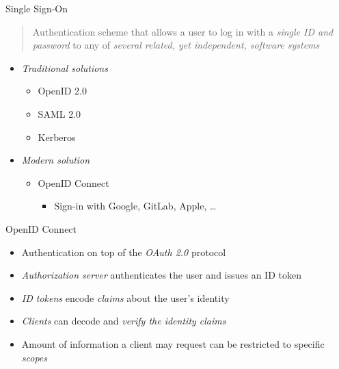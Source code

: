 \documentclass[aspectratio=169]{beamer}
\begin{document}
\begin{frame}{Single Sign-On}
	\begin{quotation}
		\hspace{-\parindent}Authentication scheme that allows a user to log in with a \emph{single ID and password} to any of \emph{several related, yet independent, software systems} 
	\end{quotation}

	\vspace*{1.5em}

	\begin{itemize}
		\item \emph{Traditional solutions}
		\begin{itemize}
			\item OpenID 2.0 \cite{openid-auth-2}
			\item SAML 2.0 \cite{saml-2} \hfill {}
			\item Kerberos \cite{kerberos}
		\end{itemize}
		\item \emph{Modern solution}
		\begin{itemize}
			\item OpenID Connect \cite{oidc-core}
			\begin{itemize}
				\item Sign-in with Google, GitLab, Apple, \dots
			\end{itemize}
		\end{itemize}
	\end{itemize}
\end{frame}

\begin{frame}{OpenID Connect}
	\begin{itemize}
		\item Authentication on top of the \emph{OAuth 2.0}  protocol \hfill {}
		\item \emph{Authorization server} authenticates the user and issues an ID token
		\item \emph{ID tokens} encode \emph{claims} about the user's identity
		\item \emph{Clients} can decode and \emph{verify the identity claims}
		\item Amount of information a client may request can be restricted to specific \emph{scopes}
	\end{itemize}
\end{frame}
\end{document}

